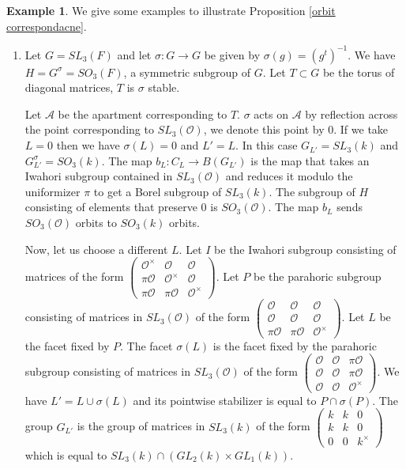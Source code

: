\documentclass[12pt]{article}
\newcommand{\A}{\mathcal{A}}
\newcommand{\s}{\mathcal{O}}
\newcommand{\<}{\langle}
\renewcommand{\>}{\rangle}
\theoremstyle{plain}
\theoremstyle{definition}
\newtheorem{exmp}[theorem]{Example} %
\begin{document}
\begin{exmp}\label{section 6 examples}
    We give some examples to illustrate Proposition \ref{orbit correspondacne}. 
    \begin{enumerate}
        \item Let $G=SL_3(F)$ and let $\sigma:G\rightarrow G$ be given by $\sigma(g)=(g^t)^{-1}$. We have $H=G^\sigma=SO_3(F)$, a symmetric subgroup of $G$.  
        Let $T\subset G$ be the torus of diagonal matrices, $T$ is $\sigma$ stable.
        
        Let $\A$ be the apartment corresponding to $T$. $\sigma$ acts on $\A$ by reflection across the point corresponding to $SL_3(\s)$, we denote this point by $0$. If we take $L=0$ then we have $\sigma(L)=0$ and $L'=L$. In this case $G_{L'}=SL_3(k)$ and $G_{L'}^\sigma=SO_3(k)$. The map $b_L:C_L\rightarrow B(G_{L'})$ is the map that takes an Iwahori subgroup contained in $SL_3(\s)$ and reduces it modulo the uniformizer $\pi$ to get a Borel subgroup of $SL_3(k)$. The subgroup of $H$ consisting of elements that preserve $0$ is $SO_3(\s)$. The map $b_L$ sends $SO_3(\s)$ orbits to $SO_3(k)$ orbits.

        Now, let us choose a different $L$. Let $I$ be the Iwahori subgroup consisting of matrices of the form $\begin{pmatrix}
            \s^\times &\s &\s \\
            \pi\s & \s^\times & \s \\
            \pi \s & \pi\s & \s^\times
        \end{pmatrix}$. Let $P$ be the parahoric subgroup consisting of matrices in $SL_3(\s)$ of the form $\begin{pmatrix}
            \s&\s &\s \\
            \s & \s & \s \\
            \pi \s & \pi\s & \s^\times
        \end{pmatrix}$. Let $L$ be the facet fixed by $P$. The facet $\sigma(L)$ is the facet fixed by the parahoric subgroup consisting of matrices in $SL_3(\s)$ of the form $\begin{pmatrix}
            \s &\s &\pi\s \\
            \s & \s & \pi\s \\
            \s & \s & \s^\times
        \end{pmatrix}$. We have $L'=L\cup \sigma(L)$ and its pointwise stabilizer is equal to $P\cap \sigma(P)$. The group $G_{L'}$ is the group of matrices in $SL_3(k)$ of the form $\begin{pmatrix}
            k & k  &0 \\
            k & k & 0 \\
            0 & 0 & k^\times
        \end{pmatrix}$ which is equal to $SL_3(k)\cap (GL_2(k)\times GL_1(k))$.


\end{enumerate}
\end{exmp}
\end{document}
